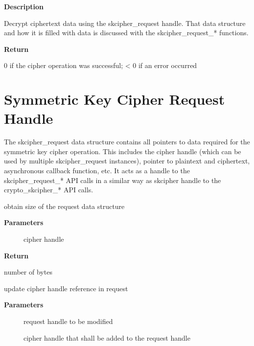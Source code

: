\documentclass[a4paper,8pt,english]{sphinxmanual}
\begin{document}
\textbf{Description}

Decrypt ciphertext data using the skcipher\_request handle. That data
structure and how it is filled with data is discussed with the
skcipher\_request\_* functions.

\textbf{Return}

0 if the cipher operation was successful; \textless{} 0 if an error occurred


\section{Symmetric Key Cipher Request Handle}
\label{crypto/api-skcipher:symmetric-key-cipher-request-handle}
The skcipher\_request data structure contains all pointers to data
required for the symmetric key cipher operation. This includes the cipher
handle (which can be used by multiple skcipher\_request instances), pointer
to plaintext and ciphertext, asynchronous callback function, etc. It acts
as a handle to the skcipher\_request\_* API calls in a similar way as
skcipher handle to the crypto\_skcipher\_* API calls.

\begin{fulllineitems}
\label{crypto/api-skcipher:c.crypto_skcipher_reqsize}
obtain size of the request data structure

\end{fulllineitems}


\textbf{Parameters}
\begin{description}
\item[{}] \leavevmode
cipher handle

\end{description}

\textbf{Return}

number of bytes

\begin{fulllineitems}
\label{crypto/api-skcipher:c.skcipher_request_set_tfm}
update cipher handle reference in request

\end{fulllineitems}


\textbf{Parameters}
\begin{description}
\item[{}] \leavevmode
request handle to be modified

\item[{}] \leavevmode
cipher handle that shall be added to the request handle

\end{description}
\end{document}
